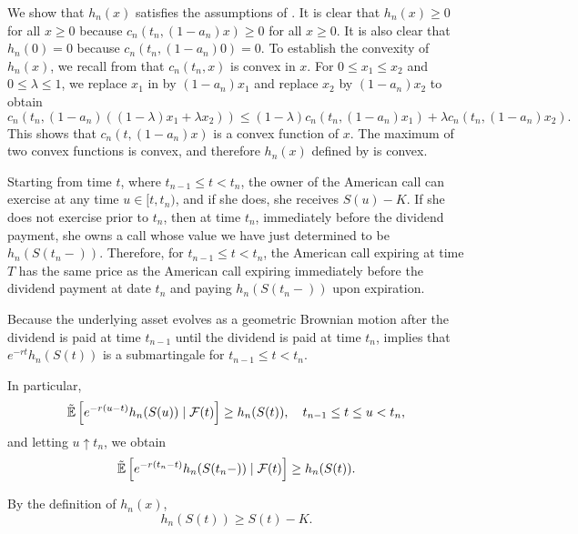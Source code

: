 We show that \(h_n(x)\) satisfies the assumptions of . It is clear that \(h_n(x) \ge 0\) for all \(x \ge 0\) because \(c_n(t_n, (1 - a_n)x) \ge 0\) for all \(x \ge 0\). It is also clear that \(h_n(0) = 0\) because \(c_n(t_n, (1 - a_n)0) = 0\). To establish the convexity of \(h_n(x)\), we recall from  that \(c_n(t_n, x)\) is convex in \(x\). For \(0 \le x_1 \le x_2\) and \(0 \le \lambda \le 1\), we replace \(x_1\) in  by \((1 - a_n)x_1\) and replace \(x_2\) by \((1 - a_n)x_2\) to obtain
\[
	c_n(t_n, (1 - a_n)((1 - \lambda)x_1 + \lambda x_2)) \le (1 - \lambda)c_n(t_n, (1 - a_n)x_1) + \lambda c_n(t_n, (1 - a_n)x_2).
\]
This shows that \(c_n(t, (1 - a_n)x)\) is a convex function of \(x\). The maximum of two convex functions is convex, and therefore \(h_n(x)\) defined by  is convex.

Starting from time \(t\), where \(t_{n-1} \le t < t_n\), the owner of the American call can exercise at any time \(u \in [t, t_n)\), and if she does, she receives \(S(u) - K\). If she does not exercise prior to \(t_n\), then at time \(t_n\), immediately before the dividend payment, she owns a call whose value we have just determined to be \(h_n(S(t_n-))\). Therefore, for \(t_{n-1} \le t < t_n\), the American call expiring at time \(T\) has the same price as the American call expiring immediately before the dividend payment at date \(t_n\) and paying \(h_n(S(t_n-))\) upon expiration.

Because the underlying asset evolves as a geometric Brownian motion after the dividend is paid at time \(t_{n-1}\) until the dividend is paid at time \(t_n\),  implies that \(e^{-rt} h_n (S(t))\) is a submartingale for \(t_{n-1} \leq t < t_n\).

In particular,
\[
	\tilde{\mathbb{E}} \left[ e^{-r(u-t)}h_n(S(u)) \mid \mathcal{F}(t) \right] \geq h_n(S(t)), \quad t_{n-1} \leq t \leq u < t_n,
\]
and letting \(u \uparrow t_n\), we obtain
\begin{equation}
	\tilde{\mathbb{E}} \left[ e^{-r(t_n-t)}h_n(S(t_n-)) \mid \mathcal{F}(t) \right] \geq h_n(S(t)). \label{eq:SubmartingaleLimitCondition}
\end{equation}

By the definition of \(h_n(x)\),
\begin{equation}
	h_n(S(t)) \geq S(t) - K. \label{eq:HnIntrinsicBound}
\end{equation}

